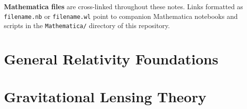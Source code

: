 \documentclass[12pt,letterpaper,twoside]{report}
\newif\ifsolutions
\begin{document}
\vspace{1cm}

\noindent
\textbf{Mathematica files} are cross-linked throughout these notes. Links formatted as
\texttt{filename.nb} or \texttt{filename.wl} point to companion Mathematica notebooks
and scripts in the \texttt{Mathematica/} directory of this repository.

\part{General Relativity Foundations}


\ifsolutions\fi


\ifsolutions\fi


\ifsolutions\fi


\ifsolutions\fi


\ifsolutions\fi

\part{Gravitational Lensing Theory}


\ifsolutions\fi


\ifsolutions\fi


\ifsolutions\fi

\ifsolutions\fi
\end{document}
